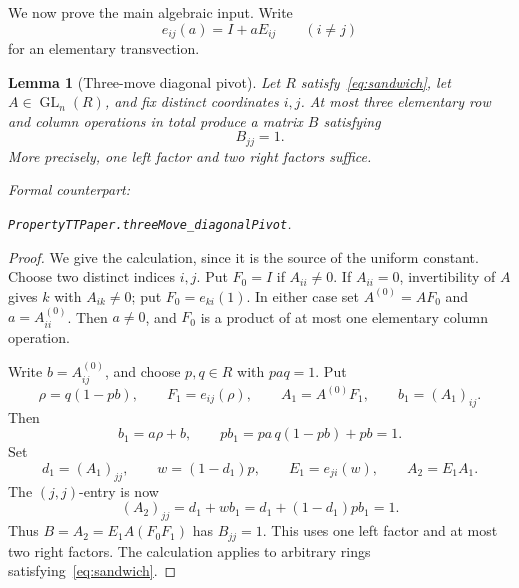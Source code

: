 \documentclass[11pt]{amsart}
\newif\ifanonymous\anonymoustrue
\newcommand{\leanrepo}{[repository link removed for anonymous review]}
\newcommand{\leanrepo}{https://github.com/SauersML/group-approximation}
\newcommand{\leanverified}[2]{%
  \par\smallskip\noindent
  {\normalfont\footnotesize\color{gray!70!black}%
  Formal counterpart:\par\nobreak\noindent
  \ifanonymous\nolinkurl{#2}\else
  \href{\leanrepo/blob/main/GroupApproximation/#1.lean}{\nolinkurl{#2}}\fi.}}
\newtheorem{lemma}[theorem]{Lemma}
\theoremstyle{definition}
\theoremstyle{plain}
\newcommand{\GL}{\operatorname{GL}}
\begin{document}
We now prove the main algebraic input.  Write
\[
  e_{ij}(a)=I+aE_{ij}\qquad(i\ne j)
\]
for an elementary transvection.

\begin{lemma}[Three-move diagonal pivot]\label{lem:pivot}
Let \(R\) satisfy~\eqref{eq:sandwich}, let \(A\in\GL_n(R)\), and
fix distinct coordinates \(i,j\).  At most three elementary row and
column operations in total produce a matrix \(B\) satisfying
\[
  B_{jj}=1.
\]
More precisely, one left factor and two right factors suffice.
\leanverified{PropertyTT/PaperStatements}{PropertyTTPaper.threeMove_diagonalPivot}
\end{lemma}

\begin{proof}
We give the calculation, since it is the source of the uniform
constant.  Choose two distinct indices \(i,j\).  Put \(F_0=I\) if
\(A_{ii}\ne0\).  If \(A_{ii}=0\), invertibility of \(A\) gives \(k\)
with \(A_{ik}\ne0\); put \(F_0=e_{ki}(1)\).  In either case set
\(A^{(0)}=AF_0\) and \(a=A^{(0)}_{ii}\).  Then \(a\ne0\), and \(F_0\)
is a product of at most one elementary column operation.

Write \(b=A^{(0)}_{ij}\), and choose \(p,q\in R\) with \(paq=1\).  Put
\[
  \rho=q(1-pb),\qquad
  F_1=e_{ij}(\rho),\qquad A_1=A^{(0)}F_1,\qquad b_1=(A_1)_{ij}.
\]
Then
\[
  b_1=a\rho+b,\qquad
  pb_1=pa\,q(1-pb)+pb=1.
\]
Set
\[
  d_1=(A_1)_{jj},\qquad
  w=(1-d_1)p,\qquad
  E_1=e_{ji}(w),\qquad A_2=E_1A_1.
\]
The \((j,j)\)-entry is now
\[
  (A_2)_{jj}=d_1+wb_1
  =d_1+(1-d_1)pb_1=1.
\]
Thus \(B=A_2=E_1A(F_0F_1)\) has \(B_{jj}=1\).  This uses one left
factor and at most two right factors.  The calculation applies to
arbitrary rings satisfying~\eqref{eq:sandwich}.
\end{proof}
\end{document}
